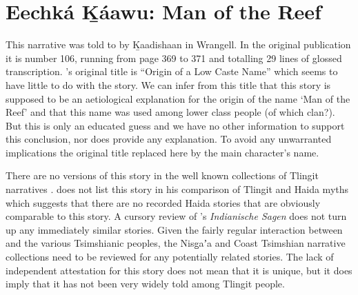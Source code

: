 
\resetexcnt
\chapter{Eechká Ḵáawu: Man of the Reef}\label{ch:106-low-caste-name}

This narrative was told to \citeauthor{swanton:1909} by Ḵaadishaan in Wrangell.
In the original publication it is number 106, running from page 369 to 371 and totalling 29 lines of glossed transcription.
\citeauthor{swanton:1909}’s original title is “Origin of a Low Caste Name” which seems to have little to do with the story.
We can infer from this title that this story is supposed to be an aetiological explanation for the origin of the name  ‘Man of the Reef’ and that this name was used among lower class people (of which clan?).
But this is only an educated guess and we have no other information to support this conclusion, nor does \citeauthor{swanton:1909} provide any explanation.
To avoid any unwarranted implications the original title replaced here by the main character’s name.

There are no versions of this story in the well known collections of Tlingit narratives \parencites{de-laguna:1972}{dauenhauer:1987}{nyman:1993}{mcclellan-cruikshank:2007c}.
\citeauthor{swanton:1905} does not list this story in his comparison of Tlingit and Haida myths \parencite{swanton:1905} which suggests that there are no recorded Haida stories that are obviously comparable to this story.
A cursory review of \citeauthor{boas:1895}’s \textit{Indianische Sagen} \parencites{boas:1895}{boas:2002} does not turn up any immediately similar stories.
Given the fairly regular interaction between  and the various Tsimshianic peoples, the Nisg̱aʼa and Coast Tsimshian narrative collections \parencites{boas:1902}{boas:1916} need to be reviewed for any potentially related stories.
The lack of independent attestation for this story does not mean that it is unique, but it does imply that it has not been very widely told among Tlingit people.

